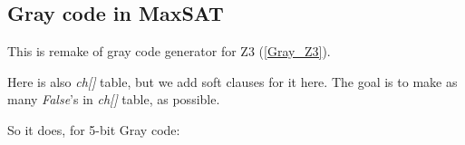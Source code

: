 \subsection{Gray code in MaxSAT}
\label{Gray_MaxSAT}

\renewcommand{\CURPATH}{gray_code/MaxSAT}

This is remake of gray code generator for Z3 (\ref{Gray_Z3}).

Here is also \textit{ch[]} table, but we add soft clauses for it here.
The goal is to make as many \textit{False}'s in \textit{ch[]} table, as possible.



So it does, for 5-bit Gray code:



